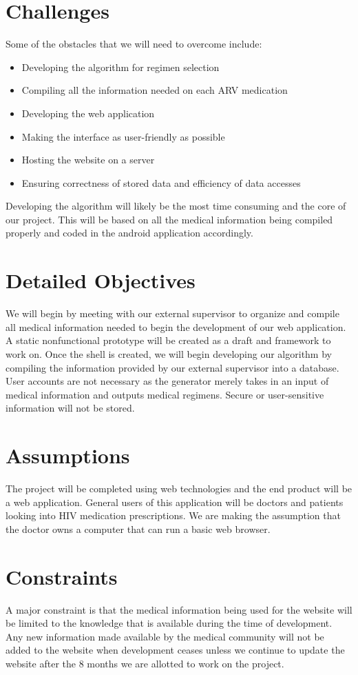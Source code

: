 \documentclass[12pt]{article}
\begin{document}
\section{Challenges}
Some of the obstacles that we will need to overcome include:
\begin{itemize}
\item Developing the algorithm for regimen selection
\item Compiling all the information needed on each ARV medication
\item Developing the web application
\item Making the interface as user-friendly as possible
\item Hosting the website on a server
\item Ensuring correctness of stored data and efficiency of data accesses
\end{itemize}
Developing the algorithm will likely be the most time consuming and the core of our project. This will be based on all the medical information being compiled properly and coded in the android application accordingly.

\section{Detailed Objectives}
We will begin by meeting with our external supervisor to organize and compile all medical information needed to begin the  development of our web application. A static nonfunctional prototype will be created as a draft and framework to work on. Once the shell is created, we will begin developing our algorithm by compiling the information provided by our external supervisor into a database. User accounts are not necessary as the generator merely takes in an input of medical information and outputs medical regimens. Secure or user-sensitive information will not be stored.

\section{Assumptions}
The project will be completed using web technologies and the end product will be a web application. General users of this application will be doctors and patients looking into HIV medication prescriptions. We are making the assumption that the doctor owns a computer that can run a basic web browser.

\section{Constraints}
A major constraint is that the medical information being used for the website will be limited to the knowledge that is available during the time of development. Any new information made available by the medical community will not be added to the website when development ceases unless we continue to update the website after the 8 months we are allotted to work on the project.
\end{document}
